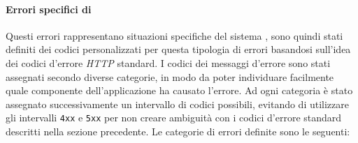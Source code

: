 \paragraph{Errori specifici di \progetto}
Questi errori rappresentano situazioni specifiche del sistema \progetto, sono quindi stati definiti dei codici personalizzati per questa tipologia di errori basandosi sull'idea dei codici d'errore \textit{HTTP} standard. I codici dei messaggi d'errore sono stati assegnati secondo diverse categorie, in modo da poter individuare facilmente quale componente dell'applicazione ha causato l'errore. Ad ogni categoria è stato assegnato successivamente un intervallo di codici possibili, evitando di utilizzare gli intervalli \texttt{4xx} e \texttt{5xx} per non creare ambiguità con i codici d'errore standard descritti nella sezione precedente.
Le categorie di errori definite sono le seguenti:
